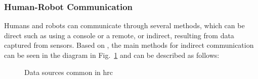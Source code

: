 \subsubsection{Human-Robot Communication}

Humans and robots can communicate through several methods, which can be direct such as using a console or a remote, or indirect, resulting from data captured from sensors. Based on \cite{Castro2021, Mukherjee2022, Semeraro2023,}, the main methods for indirect communication can be seen in the diagram in Fig.~\ref{interaction} and can be described as follows:

\begin{figure}[ht]
\centering

\caption{Data sources common in \acl{hrc}}
\label{interaction}
\end{figure}


